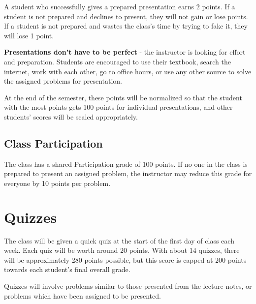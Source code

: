 \documentclass[11pt]{article}
\begin{document}
A student who successfully gives a prepared presentation earns 2 points.
If a student is not prepared and declines to present, they will not gain
or lose points.
If a student is not prepared and wastes the class's time by trying to fake it,
they will lose 1 point.

\textbf{Presentations don't have to be perfect} - the instructor is looking for
effort and preparation.
Students are encouraged to use their textbook, search the internet, work
with each other, go to office hours, or use any other source to solve the
assigned problems for presentation.

At the end of the semester, these points will be normalized so that the
student with the most points gets 100 points for individual presentations,
and other students' scores will be scaled appropriately.

\subsection{Class Participation}

The class has a shared Participation grade of 100 points.
If no one in the class is prepared to present an assigned problem, the
instructor may reduce this grade for everyone by 10 points per problem.


\section{Quizzes}

The class will be given a quick quiz at the start of the first day of class
each week. Each quiz will be worth around 20 points. With about 14 quizzes,
there will be approximately 280 points possible, but this score is capped at
200 points towards each student's final overall grade.

Quizzes will involve problems similar to those presented from the lecture
notes, or problems which have been assigned to be presented.
\end{document}
